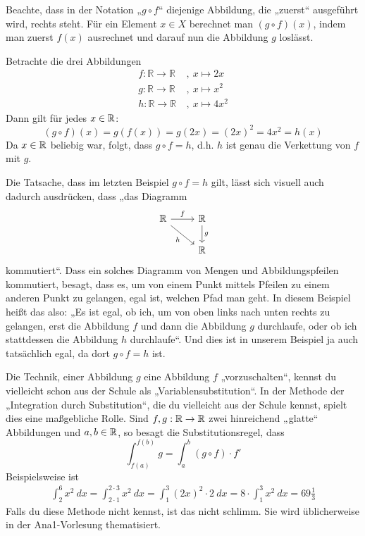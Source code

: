 \begin{bem}
 Beachte, dass in der Notation „$g\circ f$“ diejenige Abbildung, die „zuerst“ ausgeführt wird, rechts steht. Für ein Element $x \in X$ berechnet man $(g\circ f)(x)$, indem man zuerst $f(x)$ ausrechnet und darauf nun die Abbildung $g$ loslässt.
\end{bem}


\begin{bsp}
 Betrachte die drei Abbildungen
	\begin{align*}
		f: \mathbb{R} \to \mathbb{R} \ &,\ x \mapsto 2x \\
		g: \mathbb{R} \to \mathbb{R}\ &,\ x \mapsto x^2 \\
		h: \mathbb{R} \to \mathbb{R}\ &,\ x \mapsto 4x^2 
	\end{align*}
Dann gilt für jedes $x\in {\mathbb R}$:
\[ (g\circ f)(x) = g(f(x))=g(2x)=(2x)^2 = 4x^2 = h(x) \]
Da $x\in {\mathbb R}$ beliebig war, folgt, dass $g\circ f=h$, d.h. $h$ ist genau die Verkettung von $f$ mit $g$.
\end{bsp}



\begin{bsp}
Die Tatsache, dass im letzten Beispiel $g\circ f=h$ gilt, lässt sich visuell auch dadurch ausdrücken, dass „das Diagramm
	\[
	\begin{tikzcd}
		\mathbb{R} \arrow[r, "f"] \arrow[rd,"h"'] &  \arrow[d,"g"] \mathbb{R}  \\ 
		& \mathbb{R}	\end{tikzcd}
	\]
kommutiert“. Dass ein solches Diagramm von Mengen und Abbildungspfeilen kommutiert, besagt, dass es, um von einem Punkt mittels Pfeilen zu einem anderen Punkt zu gelangen, egal ist, welchen Pfad man geht. In diesem Beispiel heißt das also: „Es ist egal, ob ich, um von oben links nach unten rechts zu gelangen, erst die Abbildung $f$ und dann die Abbildung $g$ durchlaufe, oder ob ich stattdessen die Abbildung $h$ durchlaufe“. Und dies ist in unserem Beispiel ja auch tatsächlich egal, da dort $g\circ f=h$ ist.
\end{bsp}





\begin{bem}
Die Technik, einer Abbildung $g$ eine Abbildung $f$ „vorzuschalten“, kennst du vielleicht schon aus der Schule als „Variablensubstitution“. In der Methode der „Integration durch Substitution“, die du vielleicht aus der Schule kennst, spielt dies eine maßgebliche Rolle. Sind $f,g:{\mathbb R}\to {\mathbb R}$ zwei hinreichend „glatte“ Abbildungen und $a,b\in {\mathbb R}$, so besagt die Substitutionsregel, dass
 \[ \int_{f(a)}^{f(b)} g = \int_a^b (g\circ f) \cdot f' \]
 Beispielsweise ist
 \begin{align*}
  \int_2^6 x^2\ dx = \int_{2\cdot 1}^{2\cdot 3} x^2\ dx = \int_1^3 (2x)^2 \cdot 2\ dx = 8\cdot \int_1^3 x^2\ dx = 69\tfrac{1}{3}
 \end{align*}
 Falls du diese Methode nicht kennst, ist das nicht schlimm. Sie wird üblicherweise in der Ana1-Vorlesung thematisiert.
\end{bem}



